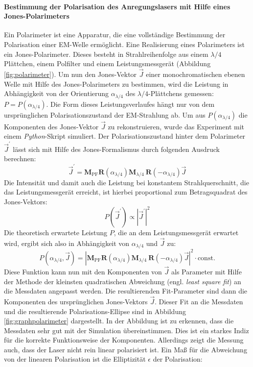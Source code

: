 \documentclass[titlepage,  ngerman]{article}
\begin{document}
	\paragraph{Bestimmung der Polarisation des Anregungslasers mit Hilfe eines Jones-Polarimeters}
	Ein Polarimeter ist eine Apparatur, die eine vollständige Bestimmung der Polarisation einer EM-Welle ermöglicht. Eine Realisierung eines Polarimeters ist ein Jones-Polarimeter. Dieses besteht in Strahlreihenfolge aus einem $\lambda / 4$ Plättchen, einem Polfilter und einem Leistungsmessgerät (Abbildung \ref{fig:polarimeter}). Um nun den Jones-Vektor $\vec{J}$ einer monochromatischen ebenen Welle mit Hilfe des Jones-Polarimeters zu bestimmen, wird die Leistung in Abhängigkeit von der Orientierung $\alpha_{\lambda/4}$ des $\lambda / 4$-Plättchens gemessen: $P = P(\alpha_{\lambda/4})$. Die Form dieses Leistungsverlaufes hängt nur von dem ursprünglichen Polarisationszustand der EM-Strahlung ab. Um aus $P(\alpha_{\lambda/4})$ die Komponenten des Jones-Vektor $\vec{J}$ zu rekonstruieren, wurde das Experiment mit einem \textit{Python}-Skript simuliert. Der Polarisationszustand hinter dem Polarimeter $\vec{J}^\prime$ lässt sich mit Hilfe des Jones-Formalismus durch folgenden Ausdruck berechnen:
	\begin{equation}
		\vec{J}^\prime = \boldsymbol{M}_\mathrm{PF} \boldsymbol{R}(\alpha_{\lambda/4})\boldsymbol{M}_{\lambda / 4}\ \boldsymbol{R}(-\alpha_{\lambda/4})\vec{J}
	\end{equation}
	Die Intensität und damit auch die Leistung bei konstantem Strahlquerschnitt, die das Leistungsmessgerät erreicht, ist hierbei proportional zum Betragsquadrat des Jones-Vektors:
	\begin{equation}
		P(\vec{J}^\prime) \propto \left|\vec{J}^\prime\right|^2
	\end{equation}
	Die theoretisch erwartete Leistung $P$, die an dem Leistungsmessgerät erwartet wird, ergibt sich also in Abhängigkeit von $\alpha_{\lambda/4}$ und $\vec{J}$ zu:
	\begin{equation}
		P(\alpha_{\lambda/4}, \vec{J}) = \left|\boldsymbol{M}_\mathrm{PF} \boldsymbol{R}(\alpha_{\lambda/4})\boldsymbol{M}_{\lambda / 4}\ \boldsymbol{R}(-\alpha_{\lambda/4})\vec{J}\right|^2 \cdot \mathrm{const.}
		\label{eq:simulation_polarimeter}
	\end{equation}
	Diese Funktion kann nun mit den Komponenten von $\vec{J}$ als Parameter mit Hilfe der Methode der kleinsten quadratischen Abweichung (engl. \textit{least square fit}) an die Messdaten angepasst werden. Die resultierenden Fit-Parameter sind dann die Komponenten des ursprünglichen Jones-Vektors $\vec{J}$. Dieser Fit an die Messdaten und die resultierende Polarisations-Ellipse sind in Abbildung \ref{fig:graphpolarimeter} dargestellt. In der Abbildung ist zu erkennen, dass die Messdaten sehr gut mit der Simulation übereinstimmen. Dies ist ein starkes Indiz für die korrekte Funktionsweise der Komponenten. Allerdings zeigt die Messung auch, dass der Laser nicht rein linear polarisiert ist. Ein Maß für die Abweichung von der linearen Polarisation ist die Elliptizität $\epsilon$ der Polarisation:
\end{document}
